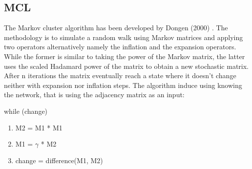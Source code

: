 \documentclass[11pt]{article}       %
\begin{document}
\subsection{MCL}
The Markov cluster algorithm has been developed by Dongen (2000) \cite{MCL}. The methodology is to simulate a random walk using Markov matrices and applying two operators alternatively namely the inflation and the expansion operators. While the former is similar to taking the power of the Markov matrix, the latter uses the scaled Hadamard power of the matrix to obtain a new stochastic matrix. After n iterations the matrix eventually reach a state where it doesn't change neither with expansion nor inflation steps.
The algorithm induce using knowing the network, that is using the adjacency matrix as an input:\newline
\begin{center}
\setlength{\fboxsep}{3pt}
\fbox
{\parbox{13cm}{
\newline
 \newline
   while (change)
\begin{enumerate}
\item M2 =  M1 * M1    
\item M1 = $\gamma$ * M2     
\item change   =  difference(M1, M2)
\end{enumerate}
}}
\end{center}
\newline
\end{document}

